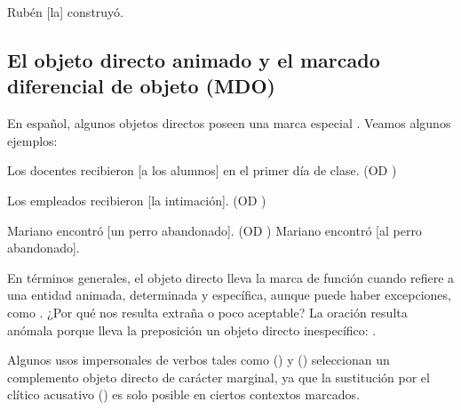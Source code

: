 \begin{exe}
  \ex Rubén [la] construyó.
\end{exe}

\subsection{El objeto directo animado y el marcado diferencial de objeto (MDO)}\label{sec:07-mdo}

En español, algunos objetos directos poseen una marca especial . Veamos
algunos ejemplos:

\begin{exe}
  \ex
    \begin{xlist}
      \ex Los docentes recibieron [a los alumnos] en el primer día de clase.
          (OD )
    \end{xlist}
  \ex
    \begin{xlist}
      \ex Los empleados recibieron [la intimación]. (OD )
    \end{xlist}
  \ex\label{ex:07-perro}
    \begin{xlist}
      \ex Mariano encontró [un perro abandonado]. (OD )
      \ex Mariano encontró [al perro abandonado].
    \end{xlist}
\end{exe}

En términos generales, el objeto directo lleva la marca de función 
cuando refiere a una entidad animada, determinada y específica, aunque puede
haber excepciones, como . ¿Por qué 
nos resulta extraña o poco aceptable? La oración resulta anómala porque lleva la
preposición  un objeto directo inespecífico: .

Algunos usos impersonales de verbos tales como  () y  () seleccionan un
complemento objeto directo de carácter marginal, ya que la sustitución por el
clítico acusativo () es solo posible en ciertos contextos
marcados.

